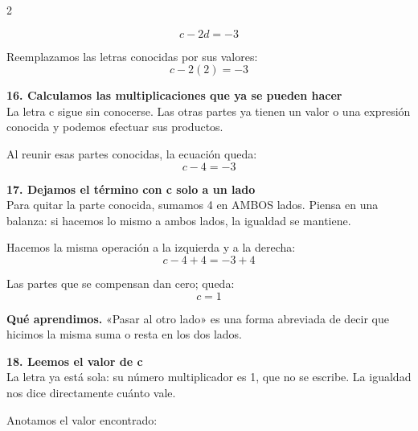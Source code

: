 \documentclass[11pt,a4paper,landscape]{article}
\begin{document}
\begin{multicols*}{2}
\begin{minipage}{\linewidth}
\[c - 2d = -3\]
\par\smallskip Reemplazamos las letras conocidas por sus valores:
\[c - 2\left(2\right)=-3\]
\end{minipage}\par\medskip
\noindent\begin{minipage}{\linewidth}\textbf{16. Calculamos las multiplicaciones que ya se pueden hacer}\\[2pt]La letra c sigue sin conocerse. Las otras partes ya tienen un valor o una expresión conocida y podemos efectuar sus productos.
\par{}\par\smallskip
\par\smallskip Al reunir esas partes conocidas, la ecuación queda:
\[c - 4=-3\]
\end{minipage}\par\medskip
\noindent\begin{minipage}{\linewidth}\textbf{17. Dejamos el término con c solo a un lado}\\[2pt]Para quitar la parte conocida, sumamos 4 en AMBOS lados. Piensa en una balanza: si hacemos lo mismo a ambos lados, la igualdad se mantiene.
\par\smallskip Hacemos la misma operación a la izquierda y a la derecha:
\[c - 4 + 4=-3 + 4\]
\par\smallskip Las partes que se compensan dan cero; queda:
\[c=1\]
\par\smallskip\textbf{Qué aprendimos.} «Pasar al otro lado» es una forma abreviada de decir que hicimos la misma suma o resta en los dos lados.
\end{minipage}\par\medskip
\noindent\begin{minipage}{\linewidth}\textbf{18. Leemos el valor de c}\\[2pt]La letra ya está sola: su número multiplicador es 1, que no se escribe. La igualdad nos dice directamente cuánto vale.
\par\smallskip Anotamos el valor encontrado:

\end{minipage}
\end{multicols*}
\end{document}
